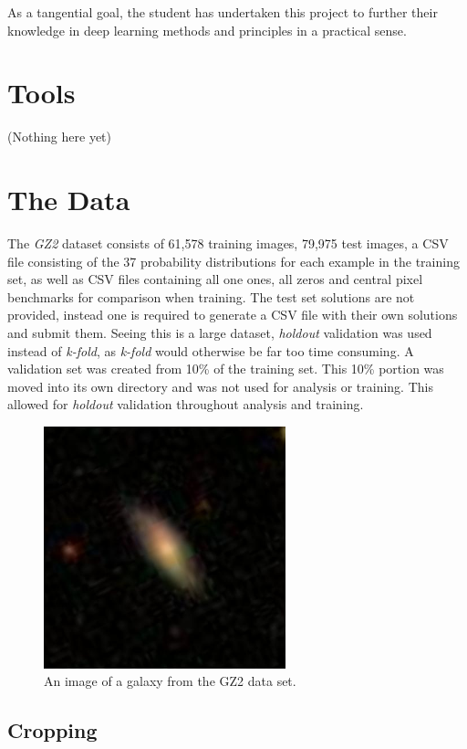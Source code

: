 \documentclass[12pt,a4paper,oneside,oldfontcommands]{memoir}
\begin{document}
As a tangential goal, the student has undertaken this project to further their knowledge in deep learning methods and principles in a practical sense.

\section{Tools}

(Nothing here yet)

\section{The Data}

The \textit{GZ2} dataset consists of 61,578 training images, 79,975 test images, a CSV file consisting of the 37 probability distributions for each example in the training set, as well as CSV files containing all one ones, all zeros and central pixel benchmarks for comparison when training. The test set solutions are not provided, instead one is required to generate a CSV file with their own solutions and submit them. Seeing this is a large dataset, \textit{holdout} validation was used instead of \textit{k-fold}, as \textit{k-fold} would otherwise be far too time consuming. A validation set was created from 10\% of the training set. This 10\% portion was moved into its own directory and was not used for analysis or training. This allowed for \textit{holdout} validation throughout analysis and training.


    \begin{figure}[ht]
    \center
      \includegraphics[width=7cm]{images/100023.jpg}
      \caption{An image of a galaxy from the GZ2 data set.}
      \label{fig:GZ2-1}
    \end{figure}
      

\subsection{Cropping} \label{Cropping}
\end{document}

